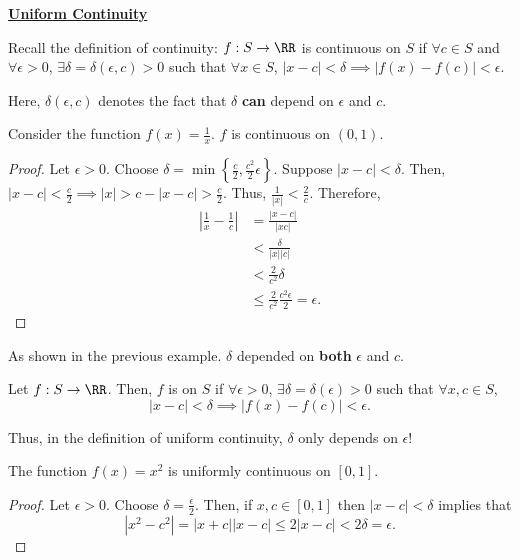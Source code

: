 
\noindent\underline{\textbf{Uniform Continuity}}

\begin{recall}
Recall the definition of continuity: $f:S\to \RR$ is continuous on $S$ if $\forall c\in S$ and $\forall\epsilon>0$, $\exists \delta = \delta(\epsilon,c)>0$ such that $\forall x\in S$, $|x-c|<\delta \implies |f(x) - f(c)|<\epsilon$.

Here, $\delta(\epsilon, c)$ denotes the fact that $\delta$ \textbf{can} depend on $\epsilon$ and $c$.
\end{recall}

\begin{example}
Consider the function $f(x) = \frac{1}{x}$. $f$ is continuous on $(0,1)$.
\end{example}
\begin{proof}
Let $\epsilon>0$. Choose $\delta = \min\left\{ \frac{c}{2}, \frac{c^2}{2}\epsilon\right\}$. Suppose $|x-c|<\delta$. Then, $|x-c|< \frac{c}{2}\implies |x| >c-|x-c|>\frac{c}{2}$. Thus, $\frac{1}{|x|}< \frac{2}{c}.$ Therefore, 
\begin{align*}
    \left|\frac{1}{x}- \frac{1}{c}\right| &= \frac{|x-c|}{|xc|} \\
    &< \frac{\delta}{|x||c|} \\
    &< \frac{2}{c^2}\delta \\
    &\leq \frac{2}{c^2} \frac{c^2 \epsilon}{2} = \epsilon.
\end{align*}
\end{proof}

As shown in the previous example. $\delta$ depended on \textbf{both} $\epsilon$ and $c$.

\begin{definition}
Let $f:S\to \RR$. Then, $f$ is  on $S$ if $\forall \epsilon >0$, $\exists \delta = \delta(\epsilon) >0$ such that $\forall x,c\in S$,
\[
|x-c|< \delta \implies |f(x) - f(c)|<\epsilon.
\]
\end{definition}
\begin{remark}
Thus, in the definition of uniform continuity, $\delta$ only depends on $\epsilon$!
\end{remark}

\begin{example}
The function $f(x) = x^2$ is uniformly continuous on $[0,1]$.
\end{example}
\begin{proof}
Let $\epsilon>0$. Choose $\delta = \frac{\epsilon}{2}$. Then, if $x,c\in [0,1]$ then $|x-c|< \delta$ implies that 
\[
|x^2-c^2| = |x+c||x-c| \leq 2|x-c| < 2\delta = \epsilon.
\]
\end{proof}


